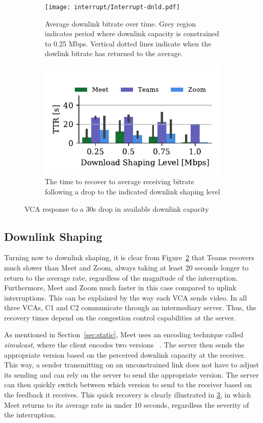 \begin{figure}[t!]
 \centering
\begin{subfigure}[t]{.45\textwidth}
   \centering
    \texttt{[image: interrupt/Interrupt-dnld.pdf]}
    \caption{Average downlink bitrate over time. Grey region indicates period where downlink capacity is constrained to 0.25 Mbps. Vertical dotted lines indicate when the dowlink bitrate has returned to the average.}
    \label{fig:ts-dnld}
\end{subfigure}
\begin{subfigure}[t]{.45\textwidth}
  \centering
    \includegraphics[width=.75\textwidth,keepaspectratio]{figures/interrupt/TTR-dnld.pdf}
    \caption{The time to recover to average receiving bitrate following a drop to the indicated downlink shaping level}
    \label{fig:TTR_dnld}
\end{subfigure}
\caption{VCA response to a 30s drop in available downlink capacity}
\label{fig:interrupt-dnld}
\end{figure}

\subsection{Downlink Shaping}

Turning now to downlink shaping, it is clear from Figure~\ref{fig:TTR_dnld} that Teams recovers much slower than Meet and Zoom, always taking at least 20 seconds longer to return to the average rate, regardless of the magnitude of the interruption. Furthermore, Meet and Zoom much faster in this case compared to uplink interruptions. This can be explained by the way each VCA sends video. In all three VCAs, C1 and C2 communicate through an intermediary server. Thus, the recovery times depend on the congestion control capabilities at the server. 


As mentioned in Section~\ref{sec:static}, Meet uses an encoding technique called \textit{simulcast}, where the client encodes two versions ~\cite{nistico2020comparative}. The server then sends the appropriate version based on the perceived downlink capacity at the receiver. This way, a sender transmitting on an unconstrained link does not have to adjust its sending and can rely on the server to send the appropriate version. The server can then quickly switch between which version to send to the receiver based on the feedback it receives. This quick recovery is clearly illustrated in \ref{fig:interrupt-dnld}, in which Meet returns to its average rate in under 10 seconds, regardless the severity of the interruption.

